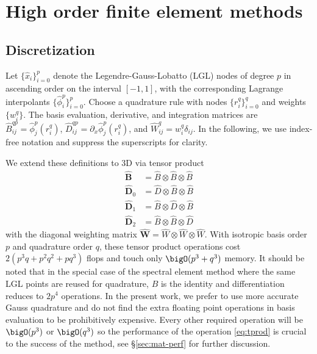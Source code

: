 \section{High order finite element methods}\label{sec:hpfem}

\subsection{Discretization}
Let $\{\hat x_i\}_{i=0}^p$ denote the Legendre-Gauss-Lobatto (LGL) nodes of degree $p$ in ascending order on the
interval $[-1,1]$, with the corresponding Lagrange interpolants $\{\hat\phi_i^p\}_{i=0}^p$.  Choose a quadrature rule
with nodes $\{r_i^q\}_{i=0}^q$ and weights $\{w_i^q\}$.  The basis evaluation, derivative, and integration matrices are
$\hat B_{ij}^{qp} = \hat\phi_j^p(r_i^q)$, $\hat D_{ij}^{qp} = \partial_x \hat\phi_j^p(r_i^q)$, and $\hat W^q_{ij} =
w_i^q\delta_{ij}$.  In the following, we use index-free notation and suppress the superscripts for clarity.

We extend these definitions to 3D via tensor product
\begin{equation}\label{eq:tprod}
  \begin{split}
    \hat{\bm B} &= \hat B \otimes \hat B \otimes \hat B \\
    \hat{\bm D}_0 &= \hat D \otimes \hat B \otimes \hat B \\
    \hat{\bm D}_1 &= \hat B \otimes \hat D \otimes \hat B \\
    \hat{\bm D}_2 &= \hat B \otimes \hat B \otimes \hat D
  \end{split}
\end{equation}
with the diagonal weighting matrix $\hat{\bm W} = \hat W \otimes \hat W \otimes \hat W$.  With isotropic basis order $p$
and quadrature order $q$, these tensor product operations cost $2(p^3 q + p^2 q^2 + pq^3)$ flops and touch only
$\bigO(p^3 + q^3)$ memory.  It should be noted that in the special case of the spectral element method where the same
LGL points are reused for quadrature, $B$ is the identity and differentiation reduces to $2p^4$ operations.  In the
present work, we prefer to use more accurate Gauss quadrature and do not find the extra floating point operations in
basis evaluation to be prohibitively expensive.  Every other required operation will be $\bigO(p^3)$ or $\bigO(q^3)$ so
the performance of the operation \eqref{eq:tprod} is crucial to the success of the method, see
\S\ref{sec:mat-perf} for further discussion.

